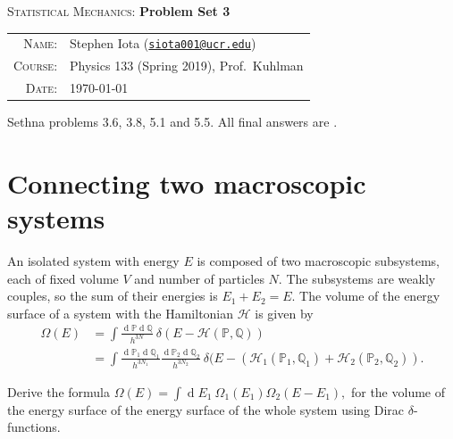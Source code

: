 \documentclass{article}
\newcommand{\email}[1]{\texttt{\href{mailto:#1}{#1}}}
\renewcommand{\d}[1]{\ensuremath{\operatorname{d}\!{#1}}}
\newenvironment{question}[0]{
\vspace{2mm}
\noindent
\itshape
}
\numberwithin{equation}{section}
\begin{document}
\begin{center}
{\Large \textsc{Statistical Mechanics}: \textbf{Problem Set 3}}
\end{center}
\vspace{.5mm}


\begin{tabular}{rl}
\textsc{Name}:			&		Stephen Iota (\email{siota001@ucr.edu})
\\
\textsc{Course}:		&		Physics 133 (Spring 2019), Prof.~Kuhlman
\\
\textsc{Date}:			&		\today
\end{tabular}
\vspace{2mm}


\noindent
Sethna problems 3.6, 3.8, 5.1 and 5.5.  All final answers are .

\section{Connecting two macroscopic systems}
An isolated system with energy $E$ is composed of two macroscopic subsystems, each of fixed volume $V$ and number of particles $N$. The subsystems are weakly couples, so the sum of their energies is $E_1 + E_2 = E$. The volume of the energy surface of a system with the Hamiltonian $\mathcal{H}$ is given by
\begin{align}
\Omega(E) &= \int \frac{\d{\mathbb{P}}\d{\mathbb{Q}}}{h^{3N}} \ \delta(E - \mathcal{H}(\mathbb{P},\mathbb{Q}))
\\
					&= \int \frac{\d{\mathbb{P}_1}\d{\mathbb{Q}_1}}{h^{3N_1}}
					\frac{\d{\mathbb{P}_2}\d{\mathbb{Q}_2}}{h^{3N_2}} \
					\delta(E - (\mathcal{H}_1(\mathbb{P}_1,\mathbb{Q}_1)+\mathcal{H}_2(\mathbb{P}_2,\mathbb{Q}_2)).
					\label{omega}
\end{align}

\begin{question}
Derive the formula $\Omega(E) = \int \d{E_1} \ \Omega_1(E_1) \Omega_2(E-E_1),$ for the volume of the energy surface of the energy surface of the whole system using Dirac $\delta$-functions.
\end{question}
\end{document}
